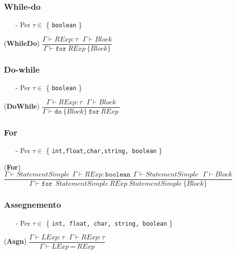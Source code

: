 \documentclass[12pt]{article}
\begin{document}
\subsubsection*{While-do}
\begin{center}
\begin{itemize}
\item[-] Per $\tau \in$ \{ \texttt{boolean} \}
\end{itemize}
\noindent(\textbf{WhileDo})
$\dfrac{\Gamma \vdash RExp:\tau\ \ \ \Gamma \vdash Block}{\Gamma \vdash \texttt{for}\ RExp\ \{ Block\}}$\\[0.1in]
\end{center}

\subsubsection*{Do-while}
\begin{center}
\begin{itemize}
\item[-] Per $\tau \in$ \{ \texttt{boolean} \}
\end{itemize}
\noindent(\textbf{DoWhile})
$\dfrac{\Gamma \vdash RExp:\tau\ \ \ \Gamma \vdash Block}{\Gamma \vdash \texttt{do} \ \{ Block\} \ \texttt{for} \ RExp\ }$\\[0.1in]
\end{center}

\subsubsection*{For}
\begin{center}
\begin{itemize}
\item[-] Per $\tau \in$ \{ \texttt{int,float,char,string, boolean} \}
\end{itemize}
\noindent(\textbf{For})
$\dfrac{\Gamma \vdash StatementSimple \ \ \Gamma \vdash RExp:\texttt{boolean} \ \ \Gamma \vdash StatementSimple \ \ \ \Gamma \vdash Block}{\Gamma \vdash  \texttt{for} \ \ StatementSimple \ RExp \ StatementSimple \ \{ Block\}}$\\[0.1in]
\end{center}

\subsubsection*{Assegnemento}
\begin{center}
\begin{itemize}
\item[-] Per $\tau \in$ \{ \texttt{int, float, char, string, boolean} \}
\end{itemize}
\noindent(\textbf{Asgn})
$\dfrac{\Gamma \vdash LExp:\tau\ \ \ \Gamma \vdash RExp:\tau}{\Gamma \vdash LExp \ \texttt{=} \ RExp}$\\[0.1in]
\end{center}
\end{document}
